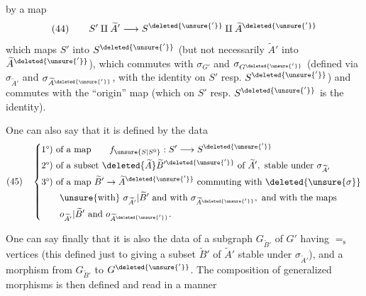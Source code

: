 by a map
\[
(44)\qquad S'\amalg\widetilde A'\longrightarrow S^{\deleted{\unsure{'}}}\amalg\widetilde A^{\deleted{\unsure{'}}}
\]
which maps $S'$ into $S^{\deleted{\unsure{'}}}$ (but not necessarily $\widetilde A'$ into $\widetilde A^{\deleted{\unsure{'}}}$), which commutes with $\sigma_{G'}$ and $\sigma_{G^{\deleted{\unsure{'}}}}$ (defined via $\sigma_{\widetilde A'}$ and $\sigma_{\widetilde A^{\deleted{\unsure{'}}}}$, with the identity on $S'$ resp. $S^{\deleted{\unsure{'}}}$) and commutes with the ``origin'' map (which on $S'$ resp. $S^{\deleted{\unsure{'}}}$ is the identity).

One can also say that it is defined by the data
\[
(45)\quad\left\{\begin{aligned}
&\text{1°) of a map}\qquad f_{\unsure{S|S^0}}:S'\longrightarrow S^{\deleted{\unsure{'}}}\\
&\text{2°) of a subset }\deleted{\widetilde A}\widetilde B^{\prime\deleted{\unsure{'}}}\text{ of }\widetilde A',\text{ stable under }\sigma_{\widetilde A'}\\
&\text{3°) of a map }\widetilde B'\to\widetilde A^{\deleted{\unsure{'}}}\text{ commuting with }\deleted{\unsure{\sigma}}\\
&\qquad\unsure{\text{with}}\ \sigma_{\widetilde A'}|\widetilde B'\text{ and with }\sigma_{\widetilde A^{\deleted{\unsure{'}}}},\text{ and with the maps}\\
&\qquad o_{\widetilde A'}|\widetilde B'\text{ and }o_{\widetilde A^{\deleted{\unsure{'}}}}.
\end{aligned}\right.
\]

One can say finally that it is also the data of a subgraph $G_{\widetilde B'}$ of $G'$ having $=_{\mathrm s}$ vertices (this defined just  to giving a subset $\widetilde B'$ of $\widetilde A'$ stable under $\sigma_{\widetilde A'}$), and a morphism from $G_{\widetilde B'}$ to $G^{\deleted{\unsure{'}}}$. The composition of generalized morphisms is then defined and read in a manner
